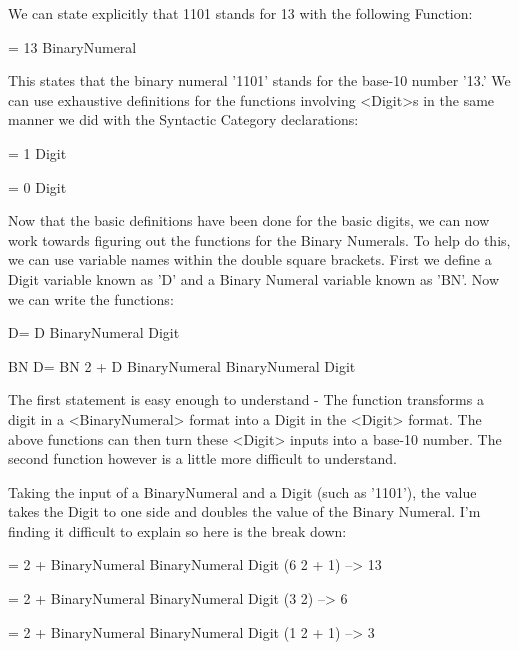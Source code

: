 \documentclass[12pt]{article}
\begin{document}
We can state explicitly that 1101 stands for 13 with the following Function:

\textrbrackdbl              = 13
      BinaryNumeral

This states that the binary numeral '1101' stands for the base-10 number '13.'
We can use exhaustive definitions for the functions involving <Digit>s in the
same manner we did with the Syntactic Category declarations:

\textrbrackdbl      = 1
   Digit

\textrbrackdbl      = 0
   Digit

Now that the basic definitions have been done for the basic digits, we can now
work towards figuring out the functions for the Binary Numerals.  To help do
this, we can use variable names within the double square brackets.  First we
define a Digit variable known as 'D' and a Binary Numeral variable known as
'BN'.  Now we can write the functions:

\textlbrackdbl D\textrbrackdbl              = \textlbrackdbl D\textrbrackdbl
   BinaryNumeral     Digit

\textlbrackdbl BN D\textrbrackdbl              = \textlbrackdbl BN\textrbrackdbl             \texttimes{} 2 + \textlbrackdbl D\textrbrackdbl
      BinaryNumeral      BinaryNumeral         Digit

The first statement is easy enough to understand - The function transforms a
digit in a <BinaryNumeral> format into a Digit in the <Digit> format.  The
above functions can then turn these <Digit> inputs into a base-10 number.  The
second function however is a little more difficult to understand.

Taking the input of a BinaryNumeral and a Digit (such as '1101'), the value
takes the Digit to one side and doubles the value of the Binary Numeral.  I'm
finding it difficult to explain so here is the break down:

\textrbrackdbl              = \textrbrackdbl             \texttimes{} 2 + \textrbrackdbl
      BinaryNumeral       BinaryNumeral         Digit (6 \texttimes{} 2 + 1) --> 13

\textrbrackdbl               = \textrbrackdbl              \texttimes{} 2 + \textrbrackdbl
      BinaryNumeral      BinaryNumeral          Digit (3 \texttimes{} 2)     --> 6

\textrbrackdbl                = \textrbrackdbl               \texttimes{} 2 + \textrbrackdbl
      BinaryNumeral     BinaryNumeral           Digit (1 \texttimes{} 2 + 1) --> 3
\end{document}

